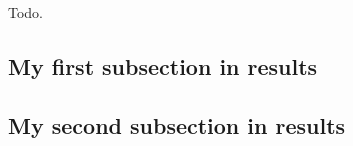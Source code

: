 \label{sec:results}

Todo.

\subsection{My first subsection in results}
\label{subsec:results_1}

\subsection{My second subsection in results}
\label{subsec:results_2}